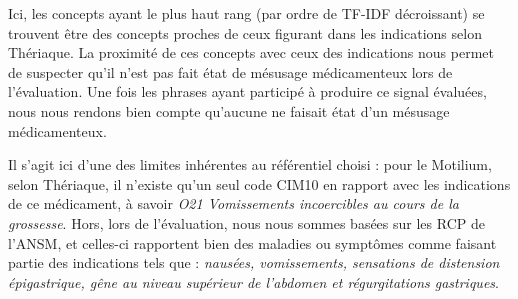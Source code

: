 \documentclass[a4paper, 12pt, openany, oneside, abstract=on]{article} %
\begin{document}
Ici, les concepts ayant le plus haut rang (par ordre de TF-IDF décroissant) se trouvent être des concepts proches de ceux figurant dans les indications selon Thériaque. La proximité de ces concepts avec ceux des indications nous permet de suspecter qu'il n'est pas fait état de mésusage médicamenteux lors de l'évaluation. Une fois les phrases ayant participé à produire ce signal évaluées, nous nous rendons bien compte qu'aucune ne faisait état d'un mésusage médicamenteux. 

Il s'agit ici d'une des limites inhérentes au référentiel choisi : pour le Motilium, selon Thériaque, il n'existe qu'un seul code CIM10 en rapport avec les indications de ce médicament, à savoir \emph{O21 Vomissements incoercibles au cours de la grossesse}. Hors, lors de l'évaluation, nous nous sommes basées sur les RCP de l'ANSM, et celles-ci rapportent bien des maladies ou symptômes comme faisant partie des indications tels que : \emph{nausées, vomissements, sensations de distension épigastrique, gêne au niveau supérieur de l'abdomen et régurgitations gastriques}.
\end{document}
